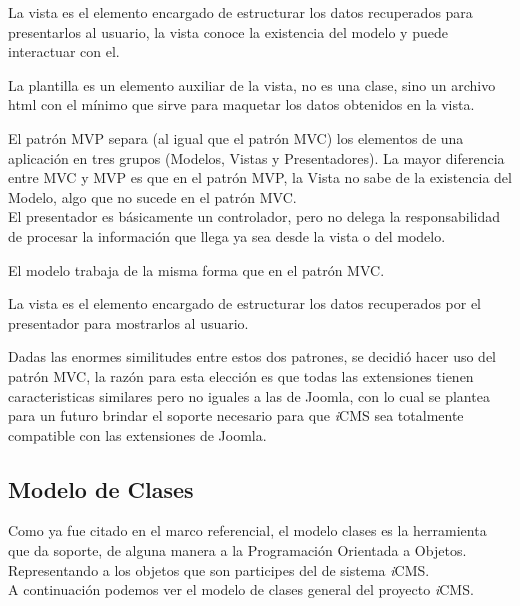 

La vista es el elemento encargado de estructurar los datos recuperados para presentarlos al usuario, la vista conoce la existencia del modelo y puede interactuar con el.



La plantilla es un elemento auxiliar de la vista, no es una clase, sino un archivo html con el m\'inimo que sirve para maquetar los datos obtenidos en la vista.



El patr\'on MVP separa (al igual que el patr\'on MVC) los elementos de una aplicaci\'on en tres grupos (Modelos, Vistas y Presentadores). La mayor diferencia entre MVC y MVP es que en el patr\'on MVP, la Vista no sabe de la existencia del Modelo, algo que no sucede en el patr\'on MVC.\\

El presentador es b\'asicamente un controlador, pero no delega la responsabilidad de procesar la informaci\'on que llega ya sea desde la vista o del modelo.



El modelo trabaja de la misma forma que en el patr\'on MVC.



La vista es el elemento encargado de estructurar los datos recuperados por el presentador para mostrarlos al usuario.



Dadas las enormes similitudes entre estos dos patrones, se decidi\'o hacer uso del patr\'on MVC, la raz\'on para esta elecci\'on es que todas las extensiones tienen caracteristicas similares pero no iguales a las de Joomla, con lo cual se plantea para un futuro brindar el soporte necesario para que \textit{i}CMS sea totalmente compatible con las extensiones de Joomla.\\

\subsection{Modelo de Clases}
Como ya fue citado en el marco referencial, el modelo clases es la herramienta que da soporte, de alguna manera a la Programaci\'on Orientada a Objetos. Representando a los objetos que son participes del de sistema \textit{i}CMS.\\
A continuaci\'on podemos ver el modelo de clases general del proyecto \textit{i}CMS.

